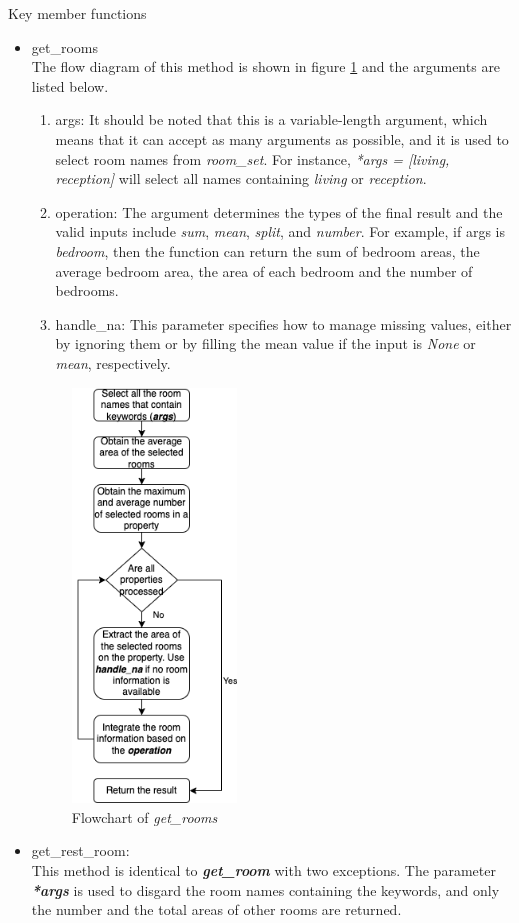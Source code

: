 \documentclass[12pt,twoside]{report}
\begin{document}
Key member functions
\begin{itemize}
	\item get\_rooms \\
	The flow diagram of this method is shown in figure \ref{extract_room_get_rooms} and the arguments are listed below.
	\begin{enumerate}
		\item args: It should be noted that this is a variable-length argument, which means that it can accept as many arguments as possible, and it is used to select room names from \textit{room\_set}. For instance, \textit{*args = [living, reception]} will select all names containing \textit{living} or \textit{reception}. 
		\item operation: The argument determines the types of the final result and the valid inputs include \textit{sum}, \textit{mean}, \textit{split}, and \textit{number}. For example, if args is \textit{bedroom}, then the function can return the sum of bedroom areas, the average bedroom area, the area of each bedroom and the number of bedrooms. 
		\item handle\_na: This parameter specifies how to manage missing values, either by ignoring them or by filling the mean value if the input is \textit{None} or \textit{mean}, respectively. 
	\end{enumerate} 
	\begin{figure}[!htbp]
		\centering
		\includegraphics[height=11cm]{extract_room_get_rooms}
		\caption{Flowchart of \textit{get\_rooms}}
		\label{extract_room_get_rooms}
	\end{figure}
	\item get\_rest\_room: \\
	This method is identical to \textit{\textbf{get\_room}} with two exceptions. The parameter \textit{\textbf{*args}} is used to disgard the room names containing the keywords, and only the number and the total areas of other rooms are returned. 
\end{itemize}
\end{document}

